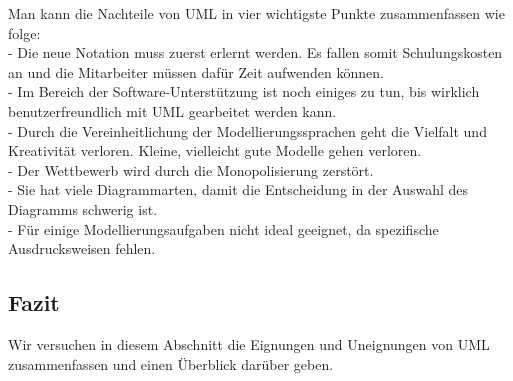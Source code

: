 Man kann die Nachteile von UML in vier wichtigste Punkte zusammenfassen wie folge:\\
- Die neue Notation muss zuerst erlernt werden. Es fallen somit Schulungskosten an
und die Mitarbeiter müssen dafür Zeit aufwenden können\cite{MT016}.\\
- Im Bereich der Software-Unterstützung ist noch einiges zu tun, bis wirklich
benutzerfreundlich mit UML gearbeitet werden kann\cite{MT016}.\\
- Durch die Vereinheitlichung der Modellierungssprachen geht die Vielfalt und
Kreativität verloren. Kleine, vielleicht gute Modelle gehen verloren\cite{MT016}.\\
- Der Wettbewerb wird durch die Monopolisierung zerstört\cite{MT016}.\\
- Sie hat viele Diagrammarten, damit die Entscheidung in der Auswahl des Diagramms schwerig ist.\\
- Für einige Modellierungsaufgaben nicht ideal geeignet, da spezifische Ausdrucksweisen fehlen.
\subsection{Fazit}

Wir versuchen in diesem Abschnitt die Eignungen und Uneignungen von UML zusammenfassen und einen Überblick darüber geben.


